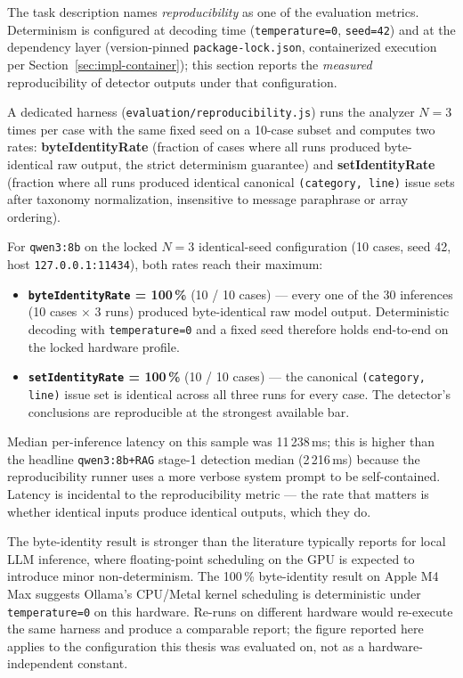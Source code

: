 The task description names \emph{reproducibility} as one of the evaluation metrics. Determinism is configured at decoding time (\texttt{temperature=0}, \texttt{seed=42}) and at the dependency layer (version-pinned \texttt{package-lock.json}, containerized execution per Section~\ref{sec:impl-container}); this section reports the \emph{measured} reproducibility of detector outputs under that configuration.

A dedicated harness (\texttt{evaluation/reproducibility.js}) runs the analyzer $N=3$ times per case with the same fixed seed on a 10-case subset and computes two rates: \textbf{byteIdentityRate} (fraction of cases where all runs produced byte-identical raw output, the strict determinism guarantee) and \textbf{setIdentityRate} (fraction where all runs produced identical canonical \texttt{(category, line)} issue sets after taxonomy normalization, insensitive to message paraphrase or array ordering).

For \texttt{qwen3:8b} on the locked $N=3$ identical-seed configuration (10 cases, seed 42, host \texttt{127.0.0.1:11434}), both rates reach their maximum:

\begin{itemize}
  \item \textbf{\texttt{byteIdentityRate} = 100\,\%} (10 / 10 cases) --- every one of the 30 inferences (10 cases $\times$ 3 runs) produced byte-identical raw model output. Deterministic decoding with \texttt{temperature=0} and a fixed seed therefore holds end-to-end on the locked hardware profile.
  \item \textbf{\texttt{setIdentityRate} = 100\,\%} (10 / 10 cases) --- the canonical \texttt{(category, line)} issue set is identical across all three runs for every case. The detector's conclusions are reproducible at the strongest available bar.
\end{itemize}

Median per-inference latency on this sample was 11\,238\,ms; this is higher than the headline \texttt{qwen3:8b+RAG} stage-1 detection median (2\,216\,ms) because the reproducibility runner uses a more verbose system prompt to be self-contained. Latency is incidental to the reproducibility metric --- the rate that matters is whether identical inputs produce identical outputs, which they do.

The byte-identity result is stronger than the literature typically reports for local LLM inference, where floating-point scheduling on the GPU is expected to introduce minor non-determinism. The 100\,\% byte-identity result on Apple M4 Max suggests Ollama's CPU/Metal kernel scheduling is deterministic under \texttt{temperature=0} on this hardware. Re-runs on different hardware would re-execute the same harness and produce a comparable report; the figure reported here applies to the configuration this thesis was evaluated on, not as a hardware-independent constant.

